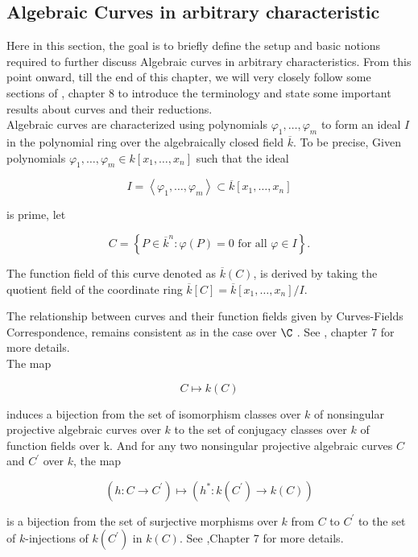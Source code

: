 \subsection{Algebraic Curves in arbitrary characteristic}

Here in this section, the goal is to briefly define the setup and basic notions required to further discuss Algebraic curves in arbitrary characteristics. From this point onward, till the end of this chapter, we will very closely follow some sections of \cite{diamond2005first}, chapter 8 to introduce the terminology and state some important results about curves and their reductions.\\ Algebraic curves are characterized using polynomials \( \varphi_{1}, \ldots, \varphi_{m} \) to form an ideal \( I \) in the polynomial ring over the algebraically closed field \( \overline{k} \). To be precise, Given polynomials $\varphi_{1}, \ldots, \varphi_{m} \in k\left[x_{1}, \ldots, x_{n}\right]$ such that the ideal

$$
I=\left\langle\varphi_{1}, \ldots, \varphi_{m}\right\rangle \subset \overline{k}\left[x_{1}, \ldots, x_{n}\right]
$$

is prime, let

$$
C=\left\{P \in \overline{k}^{n}: \varphi(P)=0 \text { for all } \varphi \in I\right\} .
$$

The function field of this curve denoted as \( \overline{k}(C) \), is derived by taking the quotient field of the coordinate ring $\overline{k}[C]=\overline{k}\left[x_{1}, \ldots, x_{n}\right] / I$. 

The relationship between curves and their function fields given by Curves-Fields Correspondence, remains consistent as in the case over $\C$ . See \cite{diamond2005first}, chapter 7 for more details. \\
The map

$$
C \mapsto k(C)
$$

induces a bijection from the set of isomorphism classes over $k$ of nonsingular projective algebraic curves over $k$ to the set of conjugacy classes over $k$ of function fields over k. And for any two nonsingular projective algebraic curves $C$ and $C^{\prime}$ over $k$, the map

$$
\left(h: C \longrightarrow C^{\prime}\right) \mapsto\left(h^{*}: k\left(C^{\prime}\right) \longrightarrow k(C)\right)
$$

is a bijection from the set of surjective morphisms over $k$ from $C$ to $C^{\prime}$ to the set of $k$-injections of $k\left(C^{\prime}\right)$ in $k(C)$. See \cite{diamond2005first},Chapter 7 for more details. \\

